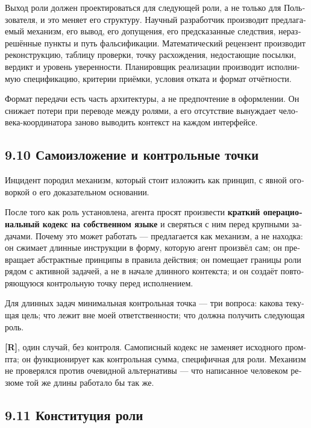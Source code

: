 \begin{russian}
Выход роли должен проектироваться для следующей роли, а не только для Пользователя, и это меняет его структуру. Научный разработчик производит предлагаемый механизм, его вывод, его допущения, его предсказанные следствия, неразрешённые пункты и путь фальсификации. Математический рецензент производит реконструкцию, таблицу проверки, точку расхождения, недостающие посылки, вердикт и уровень уверенности. Планировщик реализации производит исполнимую спецификацию, критерии приёмки, условия отката и формат отчётности.

Формат передачи есть часть архитектуры, а не предпочтение в оформлении. Он снижает потери при переводе между ролями, а его отсутствие вынуждает человека-координатора заново выводить контекст на каждом интерфейсе.


\subsection*{9.10 Самоизложение и контрольные точки}
\label{sec:ru:9.10}

Инцидент  породил механизм, который стоит изложить как принцип, с явной оговоркой о его доказательном основании.

После того как роль установлена, агента просят произвести \textbf{краткий операциональный кодекс на собственном языке} и сверяться с ним перед крупными задачами. Почему это может работать — предлагается как механизм, а не находка: он сжимает длинные инструкции в форму, которую агент произвёл сам; он превращает абстрактные принципы в правила действия; он помещает границы роли рядом с активной задачей, а не в начале длинного контекста; и он создаёт повторяющуюся контрольную точку перед исполнением.

Для длинных задач минимальная контрольная точка — три вопроса: какова текущая цель; что лежит вне моей ответственности; что должна получить следующая роль.

\textbf{[R]}, один случай, без контроля. Самописный кодекс не заменяет исходного промпта; он функционирует как контрольная сумма, специфичная для роли. Механизм не проверялся против очевидной альтернативы — что написанное человеком резюме той же длины работало бы так же.


\subsection*{9.11 Конституция роли}
\label{sec:ru:9.11}


\end{russian}
